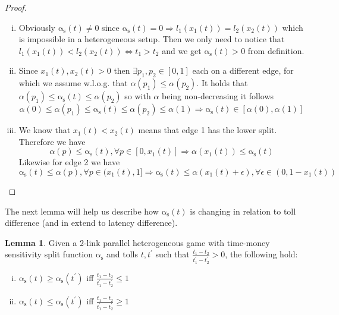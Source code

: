\documentclass[10pt,a4paper]{book}
\newcommand{\as}{\mathrm{\alpha_s}}
\theoremstyle{definition}
\newtheorem{lemma}[definition]{Lemma}
\theoremstyle{comment}
\begin{document}
\begin{proof}
	$ $ %
	\begin{enumerate}[(i)]
		\item Obviously $\as(t) \ne 0$ since $\as(t) = 0 \Rightarrow l_1(x_1(t)) = l_2(x_2(t))$ which is impossible in a heterogeneous setup.
		Then we only need to notice that $l_1(x_1(t)) < l_2(x_2(t)) \iff t_1 > t_2$ and we get $\as(t) > 0$ from definition.
		\item Since $x_1(t), x_2(t) > 0$ then $\exists p_1, p_2 \in [0, 1]$ each on a different edge, for which we assume w.l.o.g. that $\alpha(p_1) \le \alpha(p_2)$.
		It holds that $\alpha(p_1) \le \as(t) \le \alpha(p_2)$ so with $\alpha$ being non-decreasing it follows
		\[\alpha(0) \le \alpha(p_1) \le \as(t) \le \alpha(p_2) \le \alpha(1) \Rightarrow \as(t) \in [\alpha(0), \alpha(1)]\]
		\item We know that $x_1(t) < x_2(t)$ means that edge 1 has the lower split.
		Therefore we have
		\[\alpha(p) \le \as(t), \forall p \in [0, x_1(t)] \Rightarrow \alpha(x_1(t)) \le \as(t)\]
		Likewise for edge 2 we have
		\[\as(t) \le \alpha(p), \forall p \in (x_1(t), 1] \Rightarrow \as(t) \le \alpha(x_1(t) + \epsilon), \forall \epsilon \in (0, 1 - x_1(t))\]
	\end{enumerate}
\end{proof}

The next lemma will help us describe how $\as(t)$ is changing in relation to toll difference (and in extend to latency difference).
\begin{lemma}
	Given a 2-link parallel heterogeneous game with time-money sensitivity split function $\as$ and tolls $t, t^\prime$ such that $\frac{t_1 - t_2}{t_1^\prime - t_2^\prime} > 0$, the following hold:
	\begin{enumerate}[(i)]
		\item $\as(t) \ge \as(t^\prime)$ iff $\frac{t_1 - t_2}{t_1^\prime - t_2^\prime} \le 1$
		\item $\as(t) \le \as(t^\prime)$ iff $\frac{t_1 - t_2}{t_1^\prime - t_2^\prime} \ge 1$
	\end{enumerate}
\end{lemma}
\end{document}
